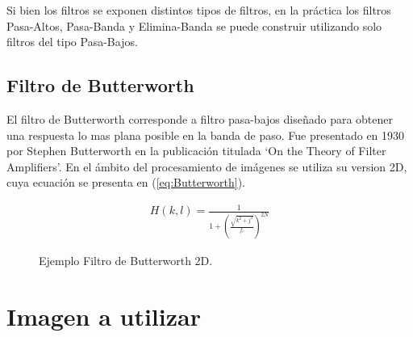 \documentclass[
  letterpaper,
  twocolumn,
  9pt,
  journal,
  final]{IEEEtran}
\begin{document}
Si bien los filtros se exponen distintos tipos de filtros, en la práctica los filtros Pasa-Altos, Pasa-Banda y Elimina-Banda se puede construir utilizando solo filtros del tipo Pasa-Bajos.

\subsection{Filtro de Butterworth}

El filtro de Butterworth corresponde a filtro pasa-bajos diseñado para obtener una respuesta lo mas plana posible en la banda de paso. Fue presentado en 1930 por Stephen Butterworth en la publicación titulada `On the Theory of Filter Amplifiers'. En el ámbito del procesamiento de imágenes se utiliza su version 2D, cuya ecuación se presenta en (\ref{eq:Butterworth}).

\begin{align}
H(k,l) = \frac{1}{ 1 + \left(  \frac{ \sqrt{k^2 + j^2} }{f_c}  \right) ^{2N} } \label{eq:Butterworth}
\end{align}

\begin{figure}[!tbh]
  \begin{center}
  \end{center}
  \caption{Ejemplo Filtro de Butterworth 2D.} \label{fig:butter_fft}
\end{figure}

\section{Imagen a utilizar}
\end{document}
